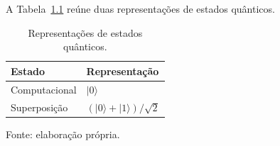 \chapter{}
A Tabela~\ref{tab:estados} reúne duas representações de estados quânticos.
\begin{table}[htbp]
\centering
\caption{Representações de estados quânticos.}
\label{tab:estados}
\begin{tabularx}{.84\textwidth}{@{}lX@{}}
\toprule
Estado & Representação \\
\midrule
Computacional & $\lvert0\rangle$ \\
Superposição & $(\lvert0\rangle+\lvert1\rangle)/\sqrt{2}$ \\
\bottomrule
\end{tabularx}
\par\medskip
\begin{minipage}{.84\textwidth}
\raggedright\footnotesize Fonte: elaboração própria.
\end{minipage}
\end{table}

